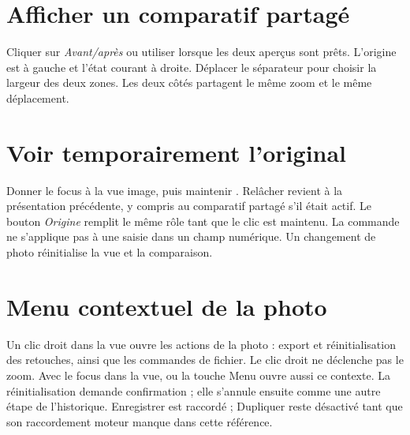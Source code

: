 \section{Afficher un comparatif partagé}
Cliquer sur \emph{Avant/après} ou utiliser  lorsque
les deux aperçus sont prêts. L’origine est à gauche et l’état courant à droite.
Déplacer le séparateur pour choisir la largeur des deux zones. Les deux côtés
partagent le même zoom et le même déplacement.

\section{Voir temporairement l’original}
Donner le focus à la vue image, puis maintenir . Relâcher revient
à la présentation précédente, y compris au comparatif partagé s’il était actif.
Le bouton \emph{Origine} remplit le même rôle tant que le clic est maintenu.
La commande ne s’applique pas à une saisie dans un champ numérique.
Un changement de photo réinitialise la vue et la comparaison.


\section{Menu contextuel de la photo}
Un clic droit dans la vue ouvre les actions de la photo : export et
réinitialisation des retouches, ainsi que les commandes de fichier.
Le clic droit ne déclenche pas le zoom. Avec le focus dans la vue,
 ou la touche Menu ouvre aussi ce contexte.
La réinitialisation demande confirmation ; elle s’annule ensuite comme une autre
étape de l’historique.
Enregistrer est raccordé ; Dupliquer reste désactivé tant que son
raccordement moteur manque dans cette référence.
